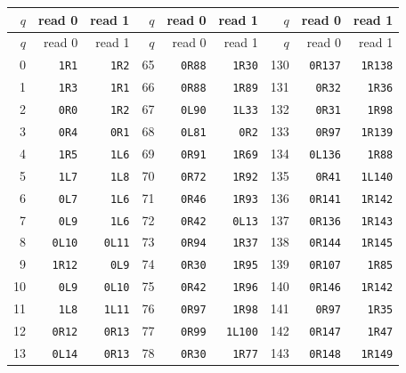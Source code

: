 {\small\setlength{\tabcolsep}{6pt}
\begin{longtable}{@{}rrr@{\hspace{18pt}}rrr@{\hspace{18pt}}rrr@{}}
\toprule $q$ & read 0 & read 1 & $q$ & read 0 & read 1 & $q$ & read 0 & read 1\\\midrule\endfirsthead
\toprule $q$ & read 0 & read 1 & $q$ & read 0 & read 1 & $q$ & read 0 & read 1\\\midrule\endhead
0 & \texttt{1R1} & \texttt{1R2} & 65 & \texttt{0R88} & \texttt{1R30} & 130 & \texttt{0R137} & \texttt{1R138}\\
1 & \texttt{1R3} & \texttt{1R1} & 66 & \texttt{0R88} & \texttt{1R89} & 131 & \texttt{0R32} & \texttt{1R36}\\
2 & \texttt{0R0} & \texttt{1R2} & 67 & \texttt{0L90} & \texttt{1L33} & 132 & \texttt{0R31} & \texttt{1R98}\\
3 & \texttt{0R4} & \texttt{0R1} & 68 & \texttt{0L81} & \texttt{0R2} & 133 & \texttt{0R97} & \texttt{1R139}\\
4 & \texttt{1R5} & \texttt{1L6} & 69 & \texttt{0R91} & \texttt{1R69} & 134 & \texttt{0L136} & \texttt{1R88}\\
5 & \texttt{1L7} & \texttt{1L8} & 70 & \texttt{0R72} & \texttt{1R92} & 135 & \texttt{0R41} & \texttt{1L140}\\
6 & \texttt{0L7} & \texttt{1L6} & 71 & \texttt{0R46} & \texttt{1R93} & 136 & \texttt{0R141} & \texttt{1R142}\\
7 & \texttt{0L9} & \texttt{1L6} & 72 & \texttt{0R42} & \texttt{0L13} & 137 & \texttt{0R136} & \texttt{1R143}\\
8 & \texttt{0L10} & \texttt{0L11} & 73 & \texttt{0R94} & \texttt{1R37} & 138 & \texttt{0R144} & \texttt{1R145}\\
9 & \texttt{1R12} & \texttt{0L9} & 74 & \texttt{0R30} & \texttt{1R95} & 139 & \texttt{0R107} & \texttt{1R85}\\
10 & \texttt{0L9} & \texttt{0L10} & 75 & \texttt{0R42} & \texttt{1R96} & 140 & \texttt{0R146} & \texttt{1R142}\\
11 & \texttt{1L8} & \texttt{1L11} & 76 & \texttt{0R97} & \texttt{1R98} & 141 & \texttt{0R97} & \texttt{1R35}\\
12 & \texttt{0R12} & \texttt{0R13} & 77 & \texttt{0R99} & \texttt{1L100} & 142 & \texttt{0R147} & \texttt{1R47}\\
13 & \texttt{0L14} & \texttt{0R13} & 78 & \texttt{0R30} & \texttt{1R77} & 143 & \texttt{0R148} & \texttt{1R149}\\

\end{longtable}}
